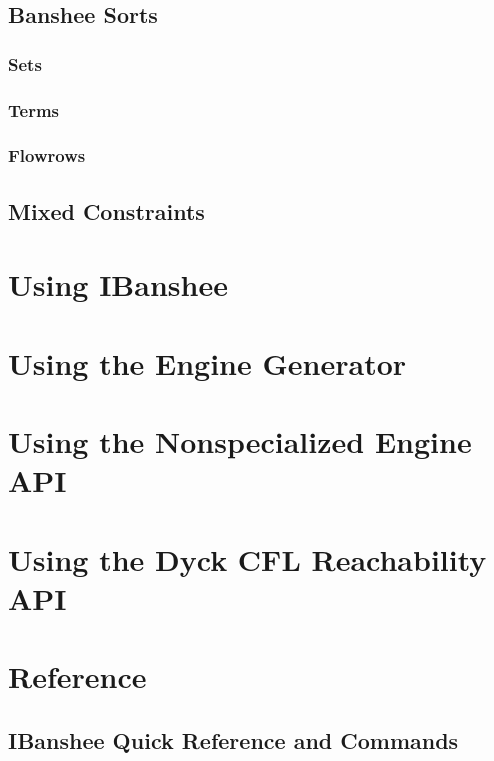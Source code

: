 \documentclass{article}
\begin{document}
\subsection{Banshee Sorts}

\subsubsection{Sets}

\subsubsection{Terms}

\subsubsection{Flowrows}

\subsection{Mixed Constraints}

\section{Using IBanshee}

\section{Using the Engine Generator}

\section{Using the Nonspecialized Engine API} 

\section{Using the Dyck CFL Reachability API}

\section{Reference}

\subsection{IBanshee Quick Reference and Commands}
\end{document}
